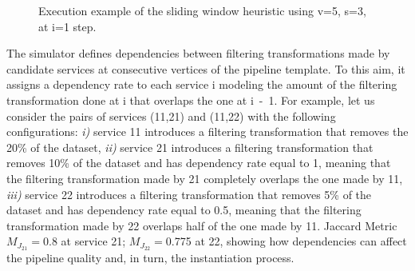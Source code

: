 \begin{figure}[!t]
{
      }
      \caption{Execution example of the sliding window heuristic using v=5, s=3,  at i=1 step.}
      \label{fig:execution_example}
    \end{figure}

    The simulator defines dependencies between filtering transformations made by candidate services at consecutive vertices of the pipeline template.
    To this aim, it assigns a dependency rate to each service \si{i} modeling the amount of the filtering transformation done at \si{i} that overlaps the one at \si{i-1}.
    For example, let us consider the pairs of services (\si{11},\si{21}) and (\si{11},\si{22}) with the following configurations: \emph{i)} service \si{11} introduces a filtering transformation that removes the 20\% of the dataset, \emph{ii)} service \si{21} introduces a filtering transformation that removes 10\% of the dataset and has dependency rate equal to 1, meaning that the filtering transformation made by \si{21} completely overlaps the one made by \si{11}, \emph{iii)} service \si{22} introduces a filtering transformation that removes 5\% of the dataset and has dependency rate equal to 0.5, meaning that the filtering transformation made by \si{22} overlaps half of the one made by \si{11}. Jaccard Metric $M_{J_{21}}$$=$0.8 at service \si{21}; $M_{J_{22}}$$=$0.775 at \si{22}, showing how dependencies can affect the pipeline quality and, in turn, the instantiation process.

